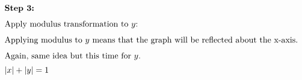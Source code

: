 \begin{enumerate}
\begin{multicols}{2}
        \end{multicols}
        \begin{multicols}{2}
            \begin{align*}
                \intertext{\textbf{Step 3:}}
                \intertext{Apply modulus transformation to $y$:}
                \intertext{Applying modulus to $y$ means that the graph will be reflected about the x-axis.}
                \intertext{Again, same idea but this time for $y$.}
                |x| + |y| &= 1\\[1mm]
            \end{align*}
            \begin{center}
            \end{center}
        \end{multicols}


\end{enumerate}
